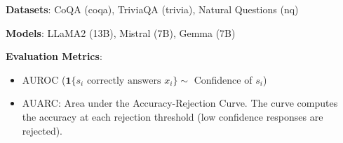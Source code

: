 \documentclass[final]{beamer}
\newlength{\sepwid}
\newlength{\rightcolwid}
\begin{document}
\begin{frame}[containsverbatim,t]
\begin{columns}[t]

\begin{column}{\sepwid}\end{column} %

\begin{column}{\rightcolwid} %



\begin{block}{\color{mydarkgreen}{Experiment Results}}


\textbf{Datasets}: CoQA (coqa), TriviaQA (trivia), Natural Questions (nq)

\textbf{Models}: LLaMA2 (13B), Mistral (7B), Gemma (7B)

\textbf{Evaluation Metrics}: 
\begin{itemize}
    \item AUROC ($\mathbf{1}\{{s_i\text{ correctly answers } x_i}\}\sim$ Confidence of $s_i$)
    \item AUARC: Area under the Accuracy-Rejection Curve. 
    The curve computes the accuracy at each rejection threshold (low confidence responses are rejected).
\end{itemize}



\end{block}
\end{column}
\end{columns}
\end{frame}
\end{document}
